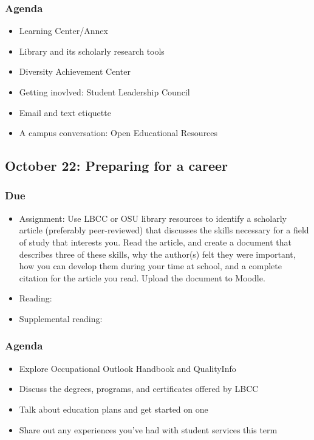 \documentclass[12pt,article,oneside]{memoir}
\begin{document}
\subsubsection{Agenda}
\begin{itemize}
 \item Learning Center/Annex
 \item Library and its scholarly research tools
 \item Diversity Achievement Center
 \item Getting inovlved: Student Leadership Council
 \item Email and text etiquette
 \item A campus conversation: Open Educational Resources
\end{itemize}



\subsection{October 22: Preparing for a career}
\subsubsection{Due}
\begin{itemize}
 \item Assignment: Use LBCC or OSU library resources to identify a scholarly article (preferably peer-reviewed) that discusses the skills necessary for a field of study that interests you.  Read the article, and create a document that describes three of these skills, why the author(s) felt they were important, how you can develop them during your time at school, and a complete citation for the article you read.  Upload the document to Moodle.
 \item Reading: \cite{worksheets}
 \item Supplemental reading: \cite{crosswalk,ooh}
\end{itemize}

\subsubsection{Agenda}
\begin{itemize}
 \item Explore Occupational Outlook Handbook and QualityInfo
 \item Discuss the degrees, programs, and certificates offered by LBCC
\item Talk about education plans and get started on one
 \item Share out any experiences you've had with student services this term
\end{itemize}
\end{document}

